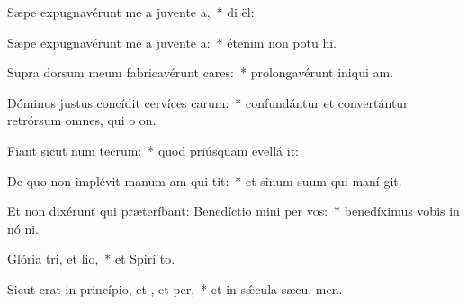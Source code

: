 \item Sæpe expugnavérunt me a juvente a,~* di  ël:
\item Sæpe expugnavérunt me a juvente a:~* étenim non potu hi.
\item Supra dorsum meum fabricavérunt cares:~* prolongavérunt iniqui am.
\item Dóminus justus concídit cervíces carum:~* confundántur et convertántur retrórsum omnes, qui o on.
\item Fiant sicut num tecrum:~* quod priúsquam evellá it:
\item De quo non implévit manum am qui tit:~* et sinum suum qui maní git.
\item Et non dixérunt qui præteríbant: Benedíctio mini per vos:~* benedíximus vobis in nó ni.
\item Glória tri, et lio,~* et Spirí to.
\item Sicut erat in princípio, et , et per,~* et in sǽcula sæcu. men.
